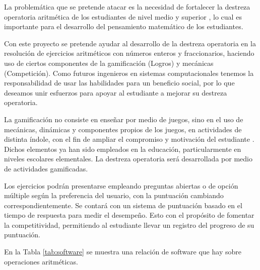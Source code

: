 \documentclass{article}
\begin{document}
La problemática que se pretende atacar es la necesidad de fortalecer la destreza 
operatoria aritmética de los estudiantes de nivel medio y superior \cite{gusty2005importance,tariq2002decline}, 
lo cual es importante para el desarrollo del pensamiento matemático de los estudiantes.


Con este proyecto se pretende ayudar al desarrollo de la destreza operatoria en la 
resolución de ejercicios aritméticos con números enteros y fraccionarios, haciendo 
uso de ciertos componentes de la gamificación (Logros) y mecánicas (Competición). 
Como futuros ingenieros en sistemas computacionales tenemos la responsabilidad de usar 
las habilidades para un beneficio social, por lo que deseamos unir esfuerzos para apoyar 
al estudiante a mejorar su destreza operatoria.


La gamificación no consiste en enseñar por medio de juegos, sino en el uso de mecánicas, 
dinámicas y componentes propios de los juegos, en actividades de distinta índole, con 
el fin de ampliar el compromiso y motivación del estudiante \cite{tariq2002decline}. 
Dichos elementos ya han sido empleados en la educación, particularmente en niveles 
escolares elementales\cite{rodrigues2017math}. La destreza operatoria será desarrollada 
por medio de actividades gamificadas.  


Los ejercicios podrán presentarse empleando preguntas abiertas o de opción múltiple 
según la preferencia del usuario, con la puntuación cambiando correspondientemente. 
Se contará con un sistema de puntuación basado en el tiempo de respuesta para medir 
el desempeño. Esto con el propósito de fomentar la competitividad, permitiendo al 
estudiante llevar un registro del progreso de su puntuación.

En la Tabla \ref{tab:software} se muestra una relación de software que hay sobre
operaciones aritméticas.
\end{document}
